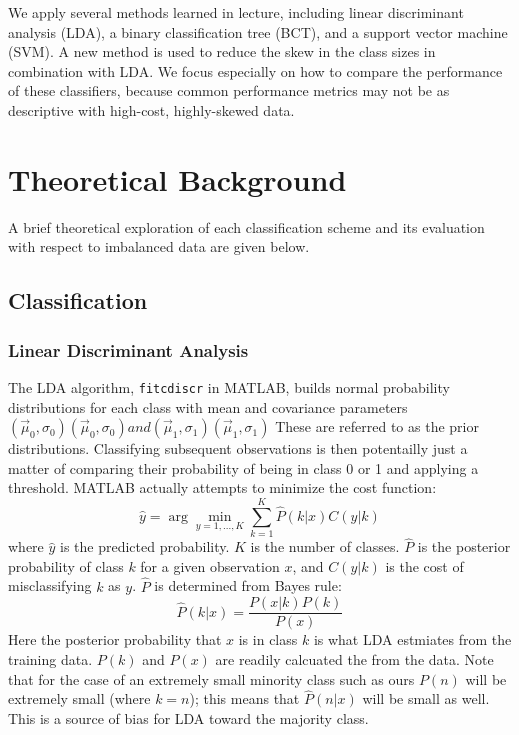 \documentclass{article}
\begin{document}
We apply several methods learned in lecture, including linear discriminant analysis (LDA), a binary classification tree (BCT), and a support vector machine (SVM). A new method is used to reduce the skew in the class sizes in combination with LDA. We focus especially on how to compare the performance of these classifiers, because common performance metrics may not be as descriptive with high-cost, highly-skewed data.

\section{Theoretical Background}
A brief theoretical exploration of each classification scheme and its evaluation with respect to imbalanced data are given below.

\subsection{Classification}
\subsubsection{Linear Discriminant Analysis}
The LDA algorithm, \texttt{fitcdiscr} in MATLAB, builds normal probability distributions for each class with mean and covariance parameters $\left({\vec {\mu }}_{0}, \sigma_{0} \right) \left({\vec {\mu }}_{0}, \sigma_{0}\right) and \left({\vec {\mu }}_{1},\sigma_{1}\right) \left({\vec {\mu }}_{1}, \sigma_{1}\right)$
These are referred to as the prior distributions. Classifying subsequent observations is then potentailly just a matter of comparing their probability of being in class 0 or 1 and applying a threshold.
MATLAB actually attempts to minimize the cost function:
\begin{equation}
\hat{y}=\arg\min_{y=1,...,K}\sum_{k=1}^{K}\hat{P}(k|x)C(y|k)
\end{equation}
where $\hat{y}$ is the predicted probability. $K$ is the number of classes. $\hat{P}$ is the posterior probability of class $k$ for a given observation $x$, and $C(y|k)$ is the cost of misclassifying $k$ as $y$.
$\hat{P}$ is determined from Bayes rule:
\begin{equation}
\hat{P}(k|x)=\frac{P(x|k)P(k)}{P(x)}
\end{equation}
Here the posterior probability that $x$ is in class $k$ is what LDA estmiates from the training data.
$P(k)$ and $P(x)$ are readily calcuated the from the data.
Note that for the case of an extremely small minority class such as ours $P(n)$ will be extremely small (where $k=n$); this means that $\hat{P}(n|x)$ will be small as well.
This is a source of bias for LDA toward the majority class.
\end{document}
